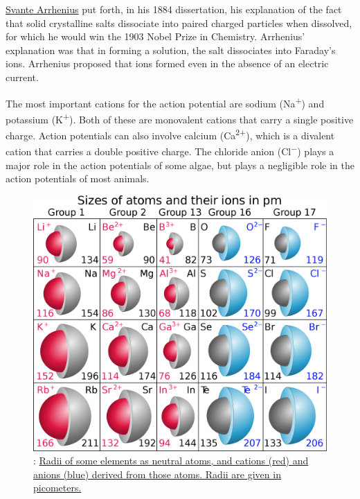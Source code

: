 \href{https://en.wikipedia.org/wiki/Svante_Arrhenius}{Svante Arrhenius} put forth, in his 1884 dissertation, his explanation of the fact that solid crystalline salts dissociate into paired charged particles when dissolved, for which he would win the 1903 Nobel Prize in Chemistry. Arrhenius' explanation was that in forming a solution, the salt dissociates into Faraday's ions. Arrhenius proposed that ions formed even in the absence of an electric current.

The most important cations for the action potential are sodium (Na\textsuperscript{+}) and potassium (K\textsuperscript{+}). Both of these are monovalent cations that carry a single positive charge. Action potentials can also involve calcium (Ca\textsuperscript{2+}), which is a divalent cation that carries a double positive charge. The chloride anion (Cl\textsuperscript{−}) plays a major role in the action potentials of some algae, but plays a negligible role in the action potentials of most animals.



\begin{figure}

{\centering \includegraphics[width=0.7\linewidth]{./figures/potential/Atomic_and_ionic_radii} 

}

\caption{: \href{https://commons.wikimedia.org/wiki/File:Atomic_\%26_ionic_radii.svg}{Radii of some elements as neutral atoms, and cations (red) and anions (blue) derived from those atoms. Radii are given in picometers.}}\label{fig:ionsize}
\end{figure}

